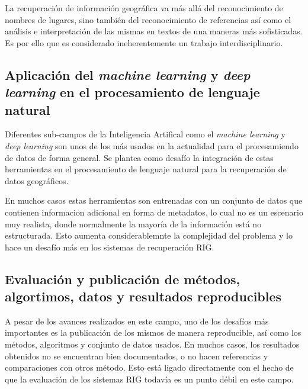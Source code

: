 La recuperación de información geográfica va más allá del
reconocimiento de nombres de lugares, sino también del reconocimiento de referencias así
como el análisis e interpretación de las mismas en textos de una maneras más
sofisticadas. Es por ello que es considerado ineherentemente un trabajo
interdisciplinario.

\subsection{Aplicación del \emph{machine learning} y \emph{deep learning} en el
procesamiento de lenguaje natural}\label{sec:ml}

Diferentes sub-campos de la Inteligencia Artifical como el \emph{machine
learning} y \emph{deep learning} son unos de los más usados en la actualidad
para el procesamiendo de datos de forma general. Se plantea como desafío la
integración de estas herramientas en el procesamiento de lenguaje natural para
la recuperación de datos geográficos.

En muchos casos estas herramientas son entrenadas con un conjunto de datos que
contienen informacion adicional en forma de metadatos, lo cual no es un escenario
muy realista, donde normalmente la mayoría de la información está no estructurada.
Esto aumenta considerablemnte la complejidad del problema y lo hace un desafío más
en los sistemas de recuperación RIG.

\subsection{Evaluación y publicación de métodos, algortimos, datos y
resultados reproducibles}\label{sec:publ}

A pesar de los avances realizados en este campo, uno de los desafíos más
importantes es la publicación de los mismos de manera reproducible, así como
los métodos, algoritmos y conjunto de datos usados. En muchos casos, los
resultados obtenidos no se encuentran bien documentados, o no hacen referencias
y comparaciones con otros método. Esto está ligado directamente con el hecho de
que la evaluación de los sistemas RIG todavía
es un punto débil en este campo.


\newpage

